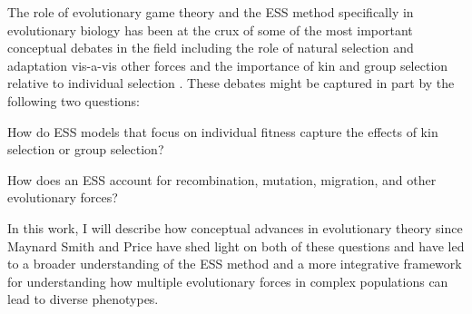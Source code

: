 \documentclass[11pt]{article}
\begin{document}
The role of evolutionary game theory and the ESS method specifically in evolutionary biology has been at the crux of some of the most important conceptual debates in the field including the role of natural selection and adaptation vis-a-vis other forces \cite[e.g.,][]{MaynardSmith:1978,Gould:Lewontin:1979,Lewontin:1979,Orzack:Sober:1994,Gardner:2017,Kern:Hahn:2018,Jensen:Payseur:2019} and the importance of kin and group selection relative to individual selection
\cite[e.g.,][]{Maynard-Smith:1964,Hamilton:1963,Price:1972:cov,Wilson:Wilson:2007,Leigh:2010,Akcay:VanCleve:2012,West:Griffin:2007,Gardner:Grafen:2009,Nowak:Tarnita:2010,Abbot:Abe:2011,Allen:Nowak:2013,Birch:2014,Birch:2017,Nowak:McAvoy:2017}. These debates might be captured in part by the following two questions: \begin{ilnum} \item \label{q:I} How do ESS models that focus on individual fitness capture the effects of kin selection or group selection? \item \label{q:II} How does an ESS account for recombination, mutation, migration, and other evolutionary forces? \end{ilnum} In this work, I will describe how conceptual advances in evolutionary theory since Maynard Smith and Price \cite{Maynard-Smith:Price:1973} have shed light on both of these questions and have led to a broader understanding of the ESS method and a more integrative framework for understanding how multiple evolutionary forces in complex populations can lead to diverse phenotypes.
\end{document}
